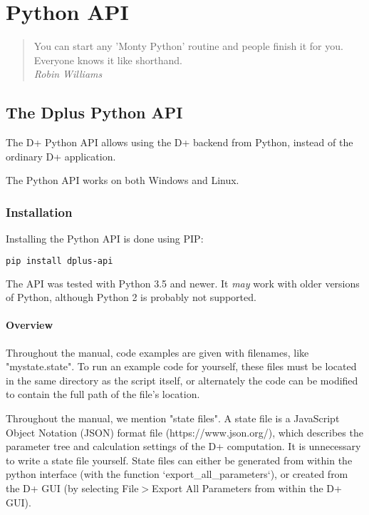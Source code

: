 \documentclass[../D+Manual.tex]{subfiles}
\begin{document}
	
\chapter{Python API} \label{chp:Python}

\begin{quote}
	You can start any 'Monty Python' routine and people finish it for you. Everyone knows it like shorthand. \\
	\hspace*{\fill} \textit{Robin Williams}
\end{quote}


\section{The Dplus Python API}\label{the-dplus-python-api}

The D+ Python API allows using the D+ backend from Python, instead of
the ordinary D+ application.

The Python API works on both Windows and Linux.

\subsection{Installation}\label{installation}

Installing the Python API is done using PIP:

\begin{lstlisting}[language=bash,basicstyle=\small, breaklines= true, breakatwhitespace= true]
pip install dplus-api
\end{lstlisting}

The API was tested with Python 3.5 and newer. It \emph{may} work with
older versions of Python, although Python 2 is probably not supported.

\subsubsection{Overview}

Throughout the manual, code examples are given with filenames, like "mystate.state".
To run an example code for yourself, these files must be located in the same directory as the script itself,
or alternately the code can be modified to contain the full path of the file's location.

Throughout the manual, we mention "state files". A state file is a JavaScript Object Notation (JSON) format file (https://www.json.org/), which describes the parameter tree and calculation settings of the D+ computation.
It is unnecessary to write a state file yourself. State files can either be generated from within the python interface (with the function `export\_all\_parameters`),
or created from the D+ GUI (by selecting File$>$Export All Parameters from within the D+ GUI).
\end{document}
